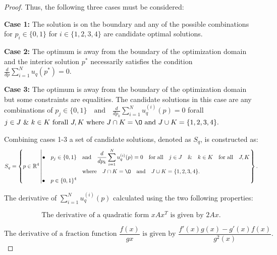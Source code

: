 \documentclass[10pt]{article}
\begin{document}
\begin{proof}
    Thus, the following three cases must be considered:
    
    \textbf{Case 1:} The solution is on the boundary and any of the possible
    combinations for $p_i \in \{0, 1\}$ for $i \in \{1, 2, 3, 4\}$ are candidate
    optimal solutions.
    
    \textbf{Case 2:} The optimum is away from the boundary of the optimization domain
    and the interior solution $p^*$ necessarily satisfies the condition
    \(\frac{d}{dp} \sum\limits_{i=1} ^ N  u_q(p^*) = 0\).
    
    \textbf{Case 3:} The optimum is away from the boundary of the optimization domain
    but some constraints are equalities. The candidate solutions in this case
    are any combinations of $p_j \in \{0, 1\} \quad \text{and} \quad \frac{d}{dp_k} 
    \sum\limits_{i=1} ^ N  u_q^{(i)}(p) = 0$ 
    forall $ j \in J \text{ \& } k \in K \text{ forall } J, K
    \text{ where } J \cap K = \O \text{ and } J \cup K = \{1, 2, 3, 4\}.$
    
    Combining cases 1-3 a set of candidate solutions, denoted as \(S_q\), is constructed as:
    {\scriptsize
    \begin{equation*}
        S_q =
        \left\{p \in \mathbb{R} ^ 4 \left|
            \begin{aligned}
                \bullet\quad p_j \in \{0, 1\} & \quad \text{and} \quad \frac{d}{dp_k} 
                \sum\limits_{i=1} ^ N  u_q^{(i)}(p) = 0
                \quad \text{for all} \quad j \in J \quad \&  \quad k \in K  \quad \text{for all} \quad J, K \\
                & \quad \text{where} \quad J \cap K = \O \quad
                \text{and} \quad J \cup K = \{1, 2, 3, 4\}.\\
                \bullet\quad  p \in \{0, 1\} ^ 4
            \end{aligned}\right.
        \right\}.
    \end{equation*}}

    The derivative of \(\sum\limits_{i=1} ^ N  u_q^{(i)}(p)\) calculated using the
    two following properties:

    \begin{equation}\label{eq:first_derivative_property}
    \text{The derivative of a quadratic form } x A x^T \text{ is given by } 2Ax.
    \end{equation}

    \begin{equation}\label{eq:second_derivative_property}
    \text{The derivative of a fraction function } \frac{f(x)}{g{x}} \text{ is given by }
    \frac{f'(x)g(x) - g'(x)f(x)}{g^2(x)}.
    \end{equation}


\end{proof}
\end{document}
